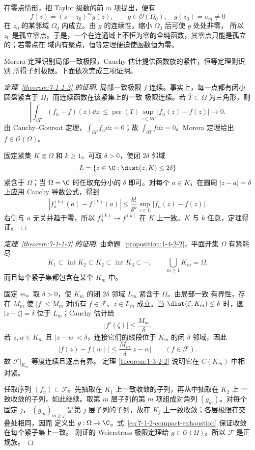 在零点情形，把 Taylor 级数的前 $m$ 项提出，便有
\[
 f(z)=(z-z_0)^m g(z),
 \qquad g\in\mathcal O(\Omega_0),\quad g(z_0)=a_m\ne0
\]
在 $z_0$ 的某邻域 $\Omega_0$ 内成立。由 $g$ 的连续性，缩小 $\Omega_0$ 后可使 $g$ 处处非零，
所以 $z_0$ 是孤立零点。于是，一个在连通域上不恒为零的全纯函数，其零点只能是孤立的；若零点在
域内有聚点，恒等定理便迫使函数恒为零。

Morera 定理识别局部一致极限，Cauchy 估计提供函数族的紧性，恒等定理则识别
所得子列极限。下面依次完成三项证明。

\begin{proof}[定理~\ref{theorem:7-1-1-2} 的证明]
局部一致极限 $f$ 连续。事实上，每一点都有闭小圆盘紧含于 $\Omega$，而连续函数在该紧集上的一致
极限连续。若 $\overline T\subset\Omega$ 为三角形，则
\[
 \left|\int_{\partial T}(f_n-f)(z)\dd z\right|
 \le \operatorname{per}(T)\sup_{z\in\partial T}|f_n(z)-f(z)|\longrightarrow0.
\]
由 Cauchy--Goursat 定理，$\int_{\partial T}f_n\dd z=0$；故
$\int_{\partial T}f\dd z=0$。Morera 定理给出 $f\in\mathcal O(\Omega)$。

固定紧集 $K\Subset\Omega$ 和 $k\ge1$。可取 $\delta>0$，使闭 $2\delta$ 邻域
\[
 L=\{z\in\C:\dist(z,K)\le2\delta\}
\]
紧含于 $\Omega$；当 $\Omega=\C$ 时任取充分小的 $\delta$ 即可。对每个 $a\in K$，在圆周
$|z-a|=\delta$ 上应用 Cauchy 导数公式，得到
\[
 |f_n^{(k)}(a)-f^{(k)}(a)|
 \le\frac{k!}{\delta^k}\sup_{z\in L}|f_n(z)-f(z)|.
\]
右侧与 $a$ 无关并趋于零，所以 $f_n^{(k)}\to f^{(k)}$ 在 $K$ 上一致。$K$ 与 $k$ 任意，定理得证。
\end{proof}

\begin{proof}[定理~\ref{theorem:7-1-1-3} 的证明]
由命题~\ref{proposition:1-4-2-2}，平面开集 $\Omega$ 有紧耗尽
\[
 K_1\subset\operatorname{int}K_2\subset K_2
 \subset\operatorname{int}K_3\subset\cdots,
 \qquad \bigcup_{m\ge1}K_m=\Omega.
 \tag{7.1.13}\label{eq:7-1-2-compact-exhaustion}
\]
而且每个紧子集都包含在某个 $K_m$ 中。

固定 $m$。取 $\delta>0$，使 $K_m$ 的闭 $2\delta$ 邻域 $L_m$ 紧含于 $\Omega$。由局部一致
有界性，存在 $M_m$ 使 $|f|\le M_m$ 对所有 $f\in\mathcal F$、$z\in L_m$ 成立。当
$\dist(\zeta,K_m)\le\delta$ 时，圆 $|z-\zeta|=\delta$ 位于 $L_m$；Cauchy 估计给
\[
 |f'(\zeta)|\le\frac{M_m}{\delta}.
\]
若 $z,w\in K_m$ 且 $|z-w|<\delta$，连接它们的线段位于 $K_m$ 的闭 $\delta$ 邻域，因此
\[
 |f(z)-f(w)|
 \le\frac{M_m}{\delta}|z-w|
 \qquad(f\in\mathcal F).
 \tag{7.1.14}\label{eq:7-1-2-montel-equicontinuity}
\]
故 $\mathcal F|_{K_m}$ 等度连续且逐点有界。\ArzelaAscoli{} 定理
\ref{theorem:1-3-2-2} 说明它在 $C(K_m)$ 中相对紧。

任取序列 $(f_n)\subset\mathcal F$。先抽取在 $K_1$ 上一致收敛的子列，再从中抽取在 $K_2$ 上
一致收敛的子列，如此继续。取第 $m$ 层子列的第 $m$ 项组成对角列 $(g_m)$。对每个固定 $j$，
$(g_m)_{m\ge j}$ 是第 $j$ 层子列的子列，故在 $K_j$ 上一致收敛；各层极限在交叠处相同，因而
定义出 $g:\Omega\to\C$。式~\eqref{eq:7-1-2-compact-exhaustion} 保证收敛在每个紧子集上一致。
刚证的 Weierstrass 极限定理给 $g\in\mathcal O(\Omega)$。所以 $\mathcal F$ 是正规族。
\end{proof}

